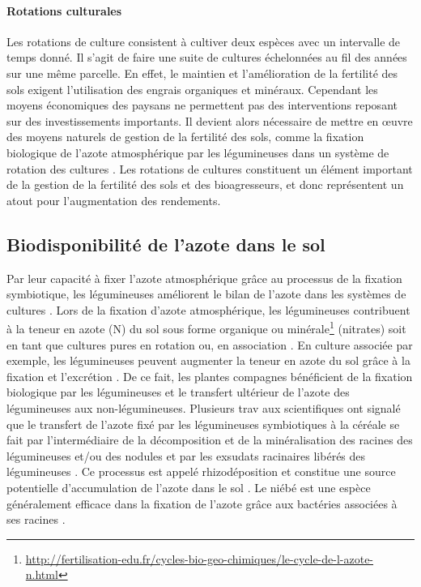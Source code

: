 \documentclass[a4paper,11pt]{article}
\begin{document}
\paragraph{Rotations culturales} Les rotations de culture consistent à
cultiver deux espèces avec un intervalle de temps donné. Il s'agit de
faire une suite de cultures échelonnées au fil des années sur une même
parcelle. En effet, le maintien et l'amélioration de la fertilité des
sols exigent l'utilisation des engrais organiques et
minéraux. Cependant les moyens économiques des paysans ne permettent
pas des interventions reposant sur des investissements importants. Il
devient alors nécessaire de mettre en œuvre des moyens naturels de
gestion de la fertilité des sols, comme la fixation biologique de
l'azote atmosphérique par les légumineuses dans un système de rotation
des cultures \cite{TRAORE_2009}. Les rotations de cultures constituent
un élément important de la gestion de la fertilité des sols et des
bioagresseurs, et donc représentent un atout pour l'augmentation des
rendements.


\subsection{Biodisponibilité de l'azote dans le sol}

Par leur capacité à fixer l'azote atmosphérique grâce au processus de
la fixation symbiotique, les légumineuses améliorent le bilan de
l'azote dans les systèmes de cultures
\cite{Ndakidemi_2005,Fustec11}. Lors de la fixation d'azote
atmosphérique, les légumineuses contribuent à la teneur en azote (N)
du sol sous forme organique ou
minérale\footnote{\url{http://fertilisation-edu.fr/cycles-bio-geo-chimiques/le-cycle-de-l-azote-n.html}}
(nitrates) soit en tant que cultures pures en rotation ou, en
association \cite{Bado_2006,Chu_2004,Makoi_2009,Ndakidemi_2005}. En
culture associée par exemple, les légumineuses peuvent augmenter la
teneur en azote du sol grâce à la fixation et l'excrétion
\cite{Trenbath_1976,Fustec11}. De ce fait, les plantes compagnes
bénéficient de la fixation biologique par les légumineuses et le
transfert ultérieur de l'azote des légumineuses aux
non-légumineuses. Plusieurs trav  aux scientifiques ont signalé que le
transfert de l'azote fixé par les légumineuses symbiotiques à la
céréale se fait par l'intermédiaire de la décomposition et de la
minéralisation des racines des légumineuses et/ou des nodules
\cite{Burity_1989} et par les exsudats racinaires libérés des
légumineuses \cite{Ndakidemi_2005,Makoi_2009}. Ce processus est appelé
rhizodéposition \cite{Fustec11} et constitue une source potentielle
d'accumulation de l'azote dans le sol \cite{Koulibi_FideleZONGO}. Le
niébé est une espèce généralement efficace dans la fixation de l'azote
grâce aux bactéries associées à ses racines \cite{TRAORE_2009}.

\newpage



\end{document}
